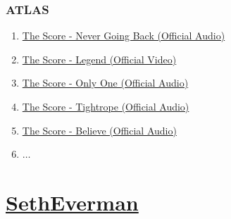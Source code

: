 \documentclass{book}
\numberwithin{equation}{section}
\begin{document}
\subsection{ATLAS}
\begin{enumerate}
    \item \href{https://www.youtube.com/watch?v=vqNjxIZ6AnE}{The Score - Never Going Back (Official Audio)}
    \item \href{https://www.youtube.com/watch?v=r1lST6mCdSA}{The Score - Legend (Official Video)}
    \item \href{https://www.youtube.com/watch?v=3fv4n6kj4xA}{The Score - Only One (Official Audio)}
    \item \href{https://www.youtube.com/watch?v=dptMwh2xJcU}{The Score - Tightrope (Official Audio)}
    \item \href{https://www.youtube.com/watch?v=_yWFkqPV7dY}{The Score - Believe (Official Audio)}
    \item $\ldots$
\end{enumerate}


\chapter{\href{https://www.youtube.com/channel/UCoNRSwYHJdy-yV1b82ZdHfQ}{SethEverman}}
\end{document}
